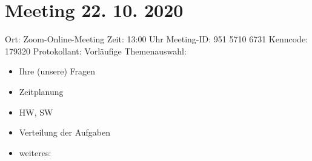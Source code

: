 \section{Meeting 22. 10. 2020}

Ort: Zoom-Online-Meeting
\newline
Zeit: 13:00 Uhr
\newline
Meeting-ID: 951 5710 6731
\newline
Kenncode: 179320
\newline
Protokollant: 
\newline
Vorläufige Themenauswahl:
\begin{itemize}
\item Ihre (unsere) Fragen
\item Zeitplanung
\item HW, SW
\item Verteilung der Aufgaben
\item weiteres:
\end{itemize}

